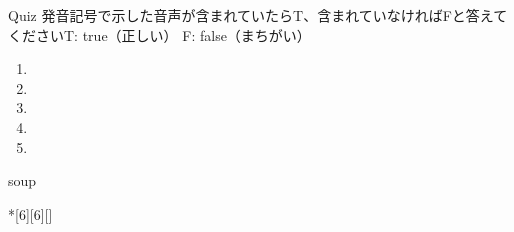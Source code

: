 \documentclass[aspectratio=169,xcolor={dvipsnames,table}]{beamer}
\begin{document}
\begin{frame}[plain]{Quiz}
\large
発音記号で示した音声が含まれていたらT、含まれていなければFと答えてください\hfill{}{\scriptsize T: true（正しい）\hspace{5pt} F: false（まちがい）}
 \begin{enumerate}
  \item \mbox{}\hspace{1\zw}
  \item \mbox{}\hspace{1\zw}
  \item \mbox{}\hspace{1\zw}
  \item \mbox{}\hspace{1\zw}
  \item \mbox{}\hspace{1\zw}
 \end{enumerate}

\hfill{}
\end{frame}
\begin{frame}[plain]{soup}
\centering
	\begin{minipage}{2.5in}
 	\begin{alphabetsoup}*[6][6][\sffamily]

	\end{alphabetsoup}
\end{minipage}

\end{frame}
\end{document}
